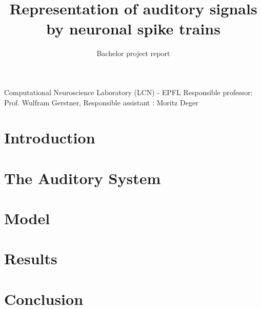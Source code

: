 \documentclass[nocopyrightspace,11pt,authoryear,preprint]{sigplanconf}
\begin{document}

\title{Representation of auditory signals by neuronal spike trains}
\subtitle{Bachelor project report} 

           {Computational Neuroscience Laboratory (LCN) - EPFL}
					 {Responsible professor: Prof. Wulfram Gerstner, 
					Responsible assistant : Moritz Deger}
\maketitle

\section{Introduction}


\section{The Auditory System}


\section{Model}


\section{Results}


\section{Conclusion}





\end{document}
